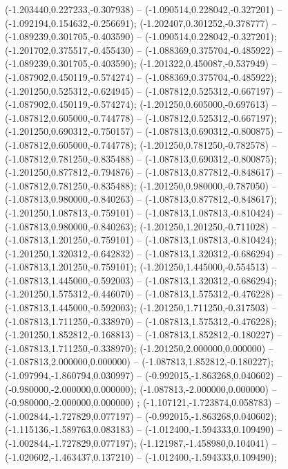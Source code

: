  (-1.203440,0.227233,-0.307938) -- (-1.090514,0.228042,-0.327201) -- (-1.092194,0.154632,-0.256691);
 (-1.202407,0.301252,-0.378777) -- (-1.089239,0.301705,-0.403590) -- (-1.090514,0.228042,-0.327201);
 (-1.201702,0.375517,-0.455430) -- (-1.088369,0.375704,-0.485922) -- (-1.089239,0.301705,-0.403590);
 (-1.201322,0.450087,-0.537949) -- (-1.087902,0.450119,-0.574274) -- (-1.088369,0.375704,-0.485922);
 (-1.201250,0.525312,-0.624945) -- (-1.087812,0.525312,-0.667197) -- (-1.087902,0.450119,-0.574274);
 (-1.201250,0.605000,-0.697613) -- (-1.087812,0.605000,-0.744778) -- (-1.087812,0.525312,-0.667197);
 (-1.201250,0.690312,-0.750157) -- (-1.087813,0.690312,-0.800875) -- (-1.087812,0.605000,-0.744778);
 (-1.201250,0.781250,-0.782578) -- (-1.087812,0.781250,-0.835488) -- (-1.087813,0.690312,-0.800875);
 (-1.201250,0.877812,-0.794876) -- (-1.087813,0.877812,-0.848617) -- (-1.087812,0.781250,-0.835488);
 (-1.201250,0.980000,-0.787050) -- (-1.087813,0.980000,-0.840263) -- (-1.087813,0.877812,-0.848617);
 (-1.201250,1.087813,-0.759101) -- (-1.087813,1.087813,-0.810424) -- (-1.087813,0.980000,-0.840263);
 (-1.201250,1.201250,-0.711028) -- (-1.087813,1.201250,-0.759101) -- (-1.087813,1.087813,-0.810424);
 (-1.201250,1.320312,-0.642832) -- (-1.087813,1.320312,-0.686294) -- (-1.087813,1.201250,-0.759101);
 (-1.201250,1.445000,-0.554513) -- (-1.087813,1.445000,-0.592003) -- (-1.087813,1.320312,-0.686294);
 (-1.201250,1.575312,-0.446070) -- (-1.087813,1.575312,-0.476228) -- (-1.087813,1.445000,-0.592003);
 (-1.201250,1.711250,-0.317503) -- (-1.087813,1.711250,-0.338970) -- (-1.087813,1.575312,-0.476228);
 (-1.201250,1.852812,-0.168813) -- (-1.087813,1.852812,-0.180227) -- (-1.087813,1.711250,-0.338970);
 (-1.201250,2.000000,0.000000) -- (-1.087813,2.000000,0.000000) -- (-1.087813,1.852812,-0.180227);
 (-1.097994,-1.860794,0.030997) -- (-0.992015,-1.863268,0.040602) -- (-0.980000,-2.000000,0.000000);
 (-1.087813,-2.000000,0.000000) -- (-0.980000,-2.000000,0.000000) ;
 (-1.107121,-1.723874,0.058783) -- (-1.002844,-1.727829,0.077197) -- (-0.992015,-1.863268,0.040602);
 (-1.115136,-1.589763,0.083183) -- (-1.012400,-1.594333,0.109490) -- (-1.002844,-1.727829,0.077197);
 (-1.121987,-1.458980,0.104041) -- (-1.020602,-1.463437,0.137210) -- (-1.012400,-1.594333,0.109490);
